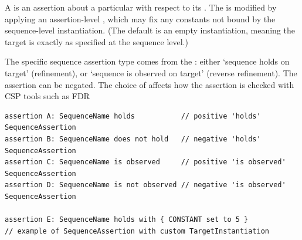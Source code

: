 A \msequenceassertion{} is an assertion about a particular \msequence{} with
respect to its \mtarget.  The \mtarget{} is modified by applying an
assertion-level \mtargetinstantiation, which may fix any constants not bound
by the sequence-level instantiation.  (The default is an empty instantiation,
meaning the target is exactly as specified at the sequence level.)

The specific sequence assertion type comes from the \msequenceassertiontype:
either `sequence holds on target' (refinement), or `sequence is observed on
target' (reverse refinement).  The assertion can be negated.  The choice of
\mcspmodel{} affects how the assertion is checked with CSP tools such as FDR

\begin{lstlisting}[style=Example]
assertion A: SequenceName holds           // positive 'holds' SequenceAssertion
assertion B: SequenceName does not hold   // negative 'holds' SequenceAssertion
assertion C: SequenceName is observed     // positive 'is observed' SequenceAssertion
assertion D: SequenceName is not observed // negative 'is observed' SequenceAssertion

assertion E: SequenceName holds with { CONSTANT set to 5 }
// example of SequenceAssertion with custom TargetInstantiation
\end{lstlisting}
